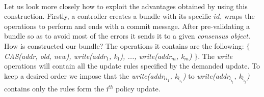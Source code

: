 \documentclass{article}
\theoremstyle{remark}
\begin{document}
\\
Let us look more closely how to exploit the advantages obtained by using this construction.
Firstly, a controller creates a bundle with its specific $id$, wraps the operations to perform and ends with a commit message. After pre-validating a bundle so as to avoid most of the errors it sends it to a given \emph{consensus object.} How is constructed our bundle? The operations it contains are the following: $\lbrace$ \emph{CAS(addr, old, new), write(addr$_1$, k$_1$), ..., write(addr$_m$, k$_m$)} $\rbrace$. The \emph{write} operations will contain all the update rules specified by the demanded update. To keep a desired order we impose that the 
\emph{write(addr$_l{_{i_1}}$, k$_{l_{i_1}}$)} to 
\emph{write(addr$_{l_{i_j}}$, k$_{l_{i_j}}$)} contains only the rules form the i$^{th}$ policy update.
  
\end{document}
